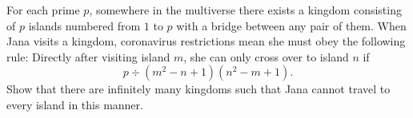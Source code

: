 For each prime $p$, somewhere in the multiverse there exists a kingdom consisting of $p$ islands
numbered from $1$ to $p$ with a bridge between any pair of them.
When Jana visits a kingdom, coronavirus restrictions mean she must obey the following rule:
Directly after visiting island $m$, she can only cross over to island $n$ if 
$$p \div (m^2-n+1)(n^2-m+1).$$
Show that there are infinitely many kingdoms such that Jana cannot travel to every island in this manner.
